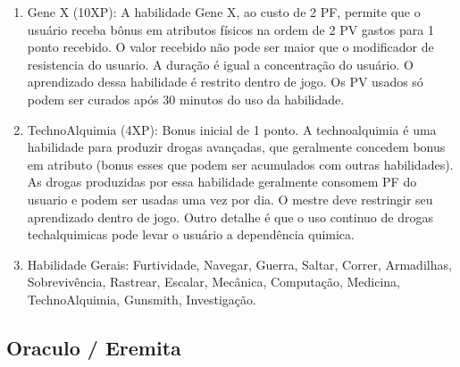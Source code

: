 \begin{enumerate}
	\item Gene X (10XP): A habilidade Gene X, ao custo de 2 PF, permite que o usuário receba bônus em atributos físicos na ordem de 2 PV gastos para 1 ponto recebido. O valor recebido não pode ser maior que o modificador de resistencia do usuario. A duração é igual a concentração do usuário. O aprendizado dessa habilidade é restrito dentro de jogo. Os PV usados só podem ser curados após 30 minutos do uso da habilidade.
	
	\item TechnoAlquimia (4XP): Bonus inicial de 1 ponto. A technoalquimia é uma habilidade para produzir drogas avançadas, que geralmente concedem bonus em atributo (bonus esses que podem ser acumulados com outras habilidades). As drogas produzidas por essa habilidade geralmente consomem PF do usuario e podem ser usadas uma vez por dia. O mestre deve restringir seu aprendizado dentro de jogo. Outro detalhe é que o uso continuo de drogas techalquimicas pode levar o usuário a dependência quimica. 
     
		
 	\item Habilidade Gerais: Furtividade, Navegar, Guerra, Saltar, Correr, Armadilhas, Sobrevivência, Rastrear, Escalar, Mecânica, Computação, Medicina, TechnoAlquimia, Gunsmith,  Investigação.

 	
\end{enumerate}
 
 \subsection{Oraculo / Eremita} 
 	
